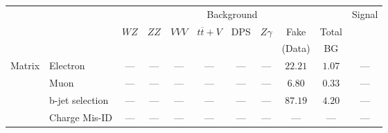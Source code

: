 \small\renewcommand{\tabcolsep}{4pt}
\begin{tabular}{|cl||ccccccc|c||c|}
\hline
 & & \multicolumn{8}{c||}{Background} & Signal \\ 
 & & $WZ$ & $ZZ$ & $VVV$ & $t\overline{t}+V$ & DPS & $Z\gamma$ & Fake & Total & \\ 
 & & &  &  &  &  &  & (Data) & BG & \\ 
\hline\hline
\multirow{2}{*}{Matrix}
& Electron &  --- &  --- &  --- &  --- &  --- &  --- & $22.21$& $1.07$&  ---\\ 
\cline{2-11}
\multirow{2}{*}{Method}
& Muon &  --- &  --- &  --- &  --- &  --- &  --- & $6.80$& $0.33$&  ---\\ 
\cline{2-11}
& b-jet selection &  --- &  --- &  --- &  --- &  --- &  --- & $87.19$& $4.20$&  ---\\ 
\hline
&Charge Mis-ID & --- & --- & --- & --- & --- & --- & --- & --- & ---\\ 
\hline
\end{tabular}
